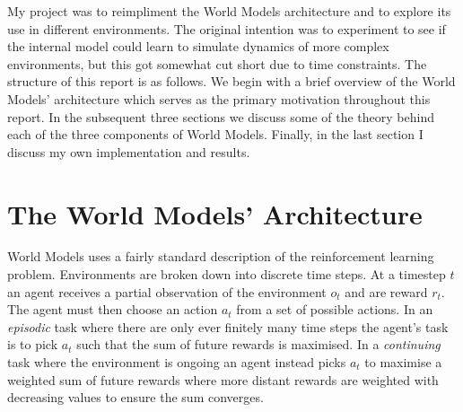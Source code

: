 \documentclass{article}
\numberwithin{figure}{section}
\theoremstyle{definition}
\begin{document}


My project was to reimpliment the World Models architecture and to explore its use in different environments.
The original intention was to experiment to see if the internal model could learn to simulate dynamics of more complex environments, but this got somewhat cut short due to time constraints.
The structure of this report is as follows.
We begin with a brief overview of the World Models' architecture which serves as the primary motivation throughout this report.
In the subsequent three sections we discuss some of the theory behind each of the three components of World Models.
Finally, in the last section I discuss my own implementation and results.

\section{The World Models' Architecture}
World Models uses a fairly standard description of the reinforcement learning problem.
Environments are broken down into discrete time steps.
At a timestep $t$ an agent receives a partial observation of the environment $o_t$ and are reward $r_t$.
The agent must then choose an action $a_t$ from a set of possible actions.
In an \textit{episodic} task where there are only ever finitely many time steps the agent's task is to pick $a_t$ such that the sum of future rewards is maximised.
In a \textit{continuing} task where the environment is ongoing an agent instead picks $a_t$ to maximise a weighted sum of future rewards where more distant rewards are weighted with decreasing values to ensure the sum converges.
\end{document}

